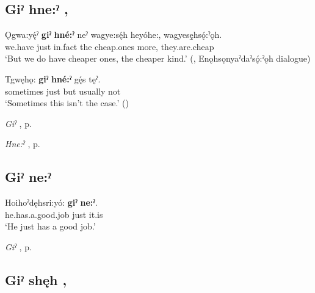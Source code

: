 \subsection*{\textbf{Giˀ hne:ˀ} , } \label{p:[giˀ hne:ˀ]}

\ea
\label{ex:gpar80}
\gll Ǫgwa:yę́ˀ \textbf{giˀ} \textbf{hné:ˀ} neˀ wagye:sę́h heyóhe:, wagyesę̱hsǫ́:ˀǫh.\\
we.have just in.fact the cheap.ones more, they.are.cheap\\
\glt ‘But we do have cheaper ones, the cheaper kind.’ (\cite[159]{mithun_watewayestanih_1984}, Enǫhsǫnyaˀdaˀsǫ́:ˀǫh dialogue)
\z

\ea
\label{ex:gpar81}
\gll Tgwęhǫ: \textbf{giˀ} \textbf{hné:ˀ} gę́s tęˀ.\\
sometimes just but usually not\\
\glt ‘Sometimes this isn’t the case.’ (\cite{mithun_how_1980})
\z

\begin{CayugaRelated}
\item \textit{Giˀ} , p. \pageref{p:[giˀ]}\\
\item \textit{Hne:ˀ} , p. \pageref{p:[hne:ˀ] ‘in fact’}
\end{CayugaRelated}

\subsection*{\textbf{Giˀ ne:ˀ} } \label{p:[giˀ ne:ˀ]}

\ea
\label{ex:gpar82}
\gll Hoihoˀdęhsri:yó: \textbf{giˀ} \textbf{ne:ˀ}.\\
he.has.a.good.job just it.is\\
\glt ‘He just has a good job.’
\z

\begin{CayugaRelated}
\item \textit{Giˀ} , p. \pageref{p:[giˀ]}
\end{CayugaRelated}

\subsection*{\textbf{Giˀ shęh} , } \label{p:[giˀ shęh]}

